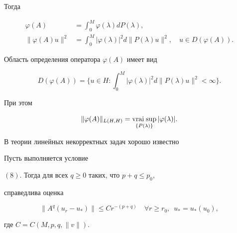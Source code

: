 Тогда 


\begin{equation} 


\begin{split} 


\varphi(A)&=\int^M_0\varphi(\lambda)d P(\lambda), \\ 


\|\varphi(A)u\|^2&=\int^M_0|\varphi(\lambda)|^2 


d\|P(\lambda)u\|^2,\quad u\in D(\varphi(A)). 


\end{split} 


\end{equation} 


Область определения оператора $\varphi(A)$ имеет вид 


\begin{equation} 


D(\varphi(A))=\bigg\{u\in H:\int^M_0 


|\varphi(\lambda)|^2d\|P(\lambda)u\|^2<\infty\bigg\}. 


\end{equation} 


При этом 


\begin{equation} 


\|\varphi(A)\|_{L(H,H)}=\vraisup_{\{P(\lambda)\}} 


|\varphi(\lambda)|. 


\end{equation} 


 


В теории линейных некорректных задач хорошо известно 


 


\begin{prop} 


Пусть выполняется условие 


$(8)$. Тогда для всех $q\ge0$ таких, что $p+q\le p_0$, 


справедлива оценка 


\begin{equation} 


\|A^q(u_r-u_*)\|\le C r^{-(p+q)}\quad 


\forall r\ge r_0,\ \; u_*=u_*(u_0), 


\end{equation} 


где $C=C(M,p,q,\|v\|)$. 


\end{prop} 


